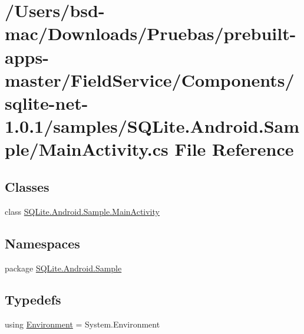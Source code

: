 \hypertarget{sqlite-net-1_80_81_2samples_2_s_q_lite_8_android_8_sample_2_main_activity_8cs}{\section{/\+Users/bsd-\/mac/\+Downloads/\+Pruebas/prebuilt-\/apps-\/master/\+Field\+Service/\+Components/sqlite-\/net-\/1.0.1/samples/\+S\+Q\+Lite.Android.\+Sample/\+Main\+Activity.cs File Reference}
\label{sqlite-net-1_80_81_2samples_2_s_q_lite_8_android_8_sample_2_main_activity_8cs}
}
\subsection*{Classes}
\begin{DoxyCompactItemize}
\item 
class \hyperlink{class_s_q_lite_1_1_android_1_1_sample_1_1_main_activity}{S\+Q\+Lite.\+Android.\+Sample.\+Main\+Activity}
\end{DoxyCompactItemize}
\subsection*{Namespaces}
\begin{DoxyCompactItemize}
\item 
package \hyperlink{namespace_s_q_lite_1_1_android_1_1_sample}{S\+Q\+Lite.\+Android.\+Sample}
\end{DoxyCompactItemize}
\subsection*{Typedefs}
\begin{DoxyCompactItemize}
\item 
using \hyperlink{sqlite-net-1_80_81_2samples_2_s_q_lite_8_android_8_sample_2_main_activity_8cs_a282800ee7039b7c85bc875ffd01a01e3}{Environment} = System.\+Environment
\end{DoxyCompactItemize}


